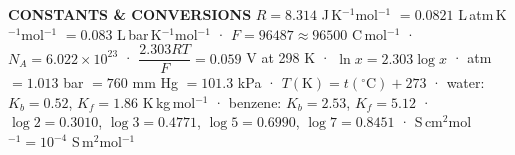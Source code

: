 \documentclass[9pt,a4paper]{extarticle}
\begin{document}
\noindent
\begin{tcolorbox}[enhanced,colback=navy!4,colframe=navy!60,boxrule=0.5pt,arc=1.5pt,left=3pt,right=3pt,top=1pt,bottom=1pt]
\scriptsize\sffamily\textbf{CONSTANTS \& CONVERSIONS}\rmfamily\quad
$R=8.314$ J\,K$^{-1}$mol$^{-1}$ $=0.0821$ L\,atm\,K$^{-1}$mol$^{-1}$ $=0.083$ L\,bar\,K$^{-1}$mol$^{-1}$ \;·\;
$F=96487\approx96500$ C\,mol$^{-1}$ \;·\; $N_A=6.022\times10^{23}$ \;·\;
$\dfrac{2.303RT}{F}=0.059$ V at 298 K \;·\; $\ln x=2.303\log x$ \;· atm $=1.013$ bar $=760$ mm Hg $=101.3$ kPa \;·\; $T(\text{K})=t(^\circ\text{C})+273$ \;·\;
water: $K_b=0.52$, $K_f=1.86$ K\,kg\,mol$^{-1}$ \;·\; benzene: $K_b=2.53$, $K_f=5.12$ \;·\;
$\log2=0.3010$, $\log3=0.4771$, $\log5=0.6990$, $\log7=0.8451$ \;· S\,cm$^2$mol$^{-1}=10^{-4}$ S\,m$^2$mol$^{-1}$
\end{tcolorbox}
\end{document}
